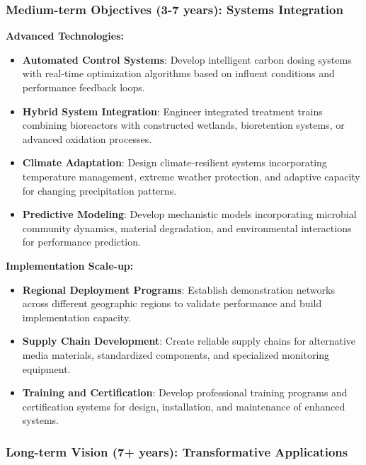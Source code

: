 \documentclass[12pt,a4paper]{article}
\begin{document}
{\subsubsection{Medium-term Objectives (3-7 years): Systems Integration}

\textbf{Advanced Technologies:}
\begin{itemize}
\item \textbf{Automated Control Systems}: Develop intelligent carbon dosing systems with real-time optimization algorithms based on influent conditions and performance feedback loops.
\item \textbf{Hybrid System Integration}: Engineer integrated treatment trains combining bioreactors with constructed wetlands, bioretention systems, or advanced oxidation processes.
\item \textbf{Climate Adaptation}: Design climate-resilient systems incorporating temperature management, extreme weather protection, and adaptive capacity for changing precipitation patterns.
\item \textbf{Predictive Modeling}: Develop mechanistic models incorporating microbial community dynamics, material degradation, and environmental interactions for performance prediction.
\end{itemize}

\textbf{Implementation Scale-up:}
\begin{itemize}
\item \textbf{Regional Deployment Programs}: Establish demonstration networks across different geographic regions to validate performance and build implementation capacity.
\item \textbf{Supply Chain Development}: Create reliable supply chains for alternative media materials, standardized components, and specialized monitoring equipment.
\item \textbf{Training and Certification}: Develop professional training programs and certification systems for design, installation, and maintenance of enhanced systems.
\end{itemize}

\subsubsection{Long-term Vision (7+ years): Transformative Applications}

}
\end{document}

